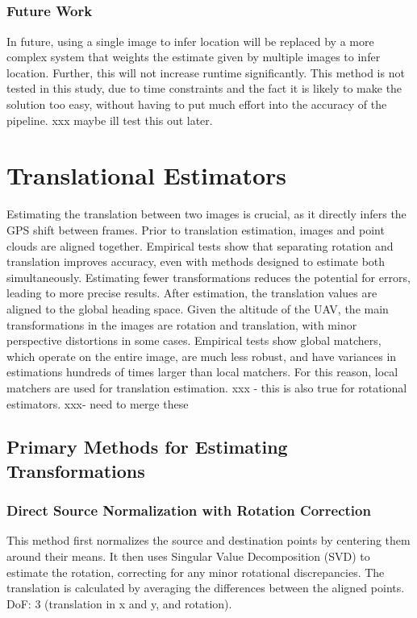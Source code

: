 \subsection*{}

\subsubsection*{Future Work}
In future, using a single image to infer location will be replaced by a more complex system that weights the estimate given by multiple images to infer location. Further, this will not increase runtime significantly. This method is not tested in this study, due to time constraints and the fact it is likely to make the solution too easy, without having to put much effort into the accuracy of the pipeline. xxx maybe ill test this out later. 


\section*{Translational Estimators}

Estimating the translation between two images is crucial, as it directly infers the GPS shift between frames. 
Prior to translation estimation, images and point clouds are aligned together. Empirical tests show that separating rotation and translation improves accuracy, even with methods designed to estimate both simultaneously. Estimating fewer transformations reduces the potential for errors, leading to more precise results.
After estimation, the translation values are aligned to the global heading space. 
Given the altitude of the UAV, the main transformations in the images are rotation and translation, with minor perspective distortions in some cases. 
Empirical tests show global matchers, which operate on the entire image, are much less robust, and have variances in estimations hundreds of times larger than local matchers. For this reason, local matchers are used for translation estimation.
xxx - this is also true for rotational estimators.
xxx- need to merge these



\subsection*{Primary Methods for Estimating Transformations}



\subsubsection*{Direct Source Normalization with Rotation Correction}
This method first normalizes the source and destination points by centering them around their means. It then uses Singular Value Decomposition (SVD) to estimate the rotation, correcting for any minor rotational discrepancies. The translation is calculated by averaging the differences between the aligned points.  
DoF: 3 (translation in x and y, and rotation). 


